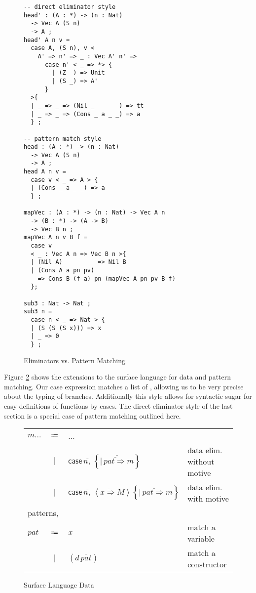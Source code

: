 \begin{figure}
\begin{lstlisting}[basicstyle={\ttfamily\small}]
-- direct eliminator style
head' : (A : *) -> (n : Nat)
  -> Vec A (S n) 
  -> A ;
head' A n v =
  case A, (S n), v <
    A' => n' => _ : Vec A' n' =>
      case n' < _ => *> {
        | (Z  ) => Unit
        | (S _) => A'
      }
  >{
  | _ => _ => (Nil _       ) => tt
  | _ => _ => (Cons _ a _ _) => a
  } ;

-- pattern match style
head : (A : *) -> (n : Nat)
  -> Vec A (S n) 
  -> A ;
head A n v =
  case v < _ => A > {
  | (Cons _ a _ _) => a
  } ;

mapVec : (A : *) -> (n : Nat) -> Vec A n 
  -> (B : *) -> (A -> B)
  -> Vec B n ;
mapVec A n v B f =
  case v 
  < _ : Vec A n => Vec B n >{
  | (Nil A)          => Nil B
  | (Cons A a pn pv) 
    => Cons B (f a) pn (mapVec A pn pv B f)
  };

sub3 : Nat -> Nat ;
sub3 n =
  case n < _ => Nat > {
  | (S (S (S x))) => x
  | _ => 0
  } ;
\end{lstlisting}



\caption{Eliminators vs. Pattern Matching}
\label{fig:data-eliminators}
\end{figure}

Figure \ref{fig:surface-data} shows the extensions to the surface language for data and pattern matching.
Our case expression matches a list of \scruts{}, allowing us to be very precise about the typing of branches.
Additionally this style allows for syntactic sugar for easy definitions of functions by cases.
The direct eliminator style \case{} of the last section is a special case of pattern matching outlined here.

\begin{figure}
\begin{tabular}{lcll}
$m...$ & $\Coloneqq$ & ... & \tabularnewline
 & $|$ & $\mathsf{case}\,\overline{n,}\,\left\{ \overline{|\,\overline{pat\Rightarrow}m}\right\} $ & data elim. without motive\tabularnewline
 & $|$ & $\mathsf{case}\,\overline{n,}\,\left\langle \overline{x\Rightarrow}M\right\rangle \left\{ \overline{|\,\overline{pat\Rightarrow}m}\right\} $ & data elim. with motive\tabularnewline
\multicolumn{4}{l}{patterns,}\tabularnewline
$pat$ & $\Coloneqq$ & $x$ & match a variable\tabularnewline
 & $|$ & $(d\,\overline{pat})$ & match a constructor\tabularnewline
\end{tabular}

\caption{Surface Language Data}
\label{fig:surface-data}
\end{figure}

